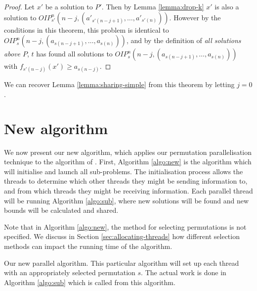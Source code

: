 \documentclass{amsart}
\theoremstyle{definition}
\begin{document}
\begin{proof}
 Let $x'$ be a solution to $P'$.
 Then by Lemma \ref{lemma:drop-k} $x'$ is also a solution to ${O\!I\!P}^n_{s'}(n-j, (a'_{s'(n-j+1)},\dots,\allowbreak a'_{s'(n)}))$.
 However by the conditions in this theorem, this problem is identical to ${O\!I\!P}^n_s(n-j, (a_{s(n-j+1)},\dots,\allowbreak a_{s(n)}))$, and by the definition of {\em all solutions above $P$}, $t$ has found all solutions to ${O\!I\!P}^n_s(n-j, (a_{s(n-j+1)},\dots,\allowbreak a_{s(n)}))$ with $f_{s'(n-j)}(x') \geq a_{s(n-j)}$.
\end{proof}

We can recover Lemma \ref{lemma:sharing-simple} from this theorem by letting $j=0$.

\section{New algorithm}\label{sec:newalgo}
We now present our new algorithm, which applies our permutation parallelisation technique to the algorithm of \cite{Ozlen2014moipaira}.
First, Algorithm \ref{algo:new} is the algorithm which will initialise and launch all sub-problems.
The initialisation process allows the threads to determine which other threads they might be sending information to, and from which threads they might be receiving information.
Each parallel thread will be running Algorithm \ref{algo:sub}, where new solutions will be found and new bounds will be calculated and shared.

Note that in Algorithm \ref{algo:new}, the method for selecting permutations is not specified.
We discuss in Section \ref{sec:allocating-threads} how different selection methods can impact the running time of the algorithm.

\begin{algorithm}\label{algo:new}
  \DontPrintSemicolon
  \caption{Our new parallel algorithm. This particular algorithm will set up each thread with an appropriately selected permutation $s$. The actual work is done in Algorithm \ref{algo:sub} which is called from this algorithm.}
\end{algorithm}
\end{document}
